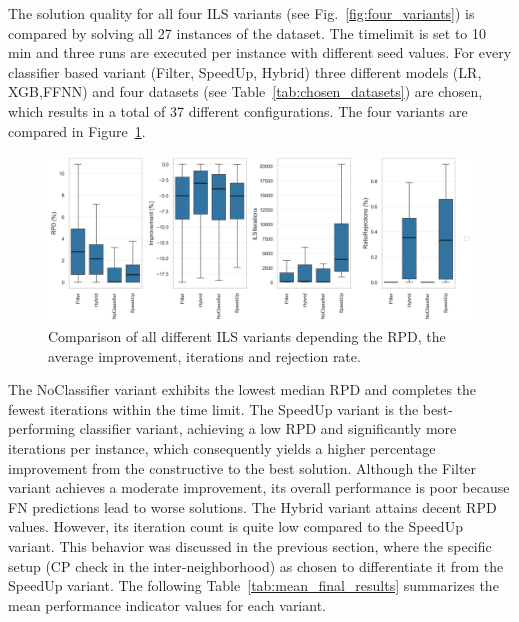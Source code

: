 The solution quality for all four ILS variants (see Fig.~\ref{fig:four_variants}) is compared by solving all 27 instances of the
\gendreauDataSetText dataset. The timelimit is set to 10 min and three runs are executed per instance with different seed values.
For every classifier based variant (Filter, SpeedUp, Hybrid) three different models (\gls{LR}, \gls{XGB},\gls{FFNN}) and four datasets
(see Table~\ref{tab:chosen_datasets}) are chosen, which results in a total of 37 different configurations. The four variants are compared
in Figure~\ref{fig:boxplots_final_comparison}.
\begin{figure}[!ht]
    \centering
    \includegraphics[width =\textwidth]{pictures/final_results/LoadingCheckerType_boxplot_final_results.png}
    \caption{Comparison of all different ILS variants depending the RPD, the average improvement, iterations and rejection rate.}
    \label{fig:boxplots_final_comparison}
\end{figure}
The NoClassifier variant exhibits the lowest median \gls{RPD} and completes the fewest iterations within the time limit.
The SpeedUp variant is the best-performing classifier variant, achieving a low \gls{RPD} and significantly more iterations per
instance, which consequently yields a higher percentage improvement from the constructive to the best solution.
Although the Filter variant achieves a moderate improvement, its overall performance is poor because \gls{FN} predictions
lead to worse solutions. The Hybrid variant attains decent \gls{RPD} values. However, its iteration count is quite low
compared to the SpeedUp variant. This behavior was discussed in the previous section, where the specific setup (\gls{CP} check in the inter-neighborhood)
as chosen to differentiate it from the SpeedUp variant. The following Table~\ref{tab:mean_final_results}
summarizes the mean performance indicator values for each variant.
